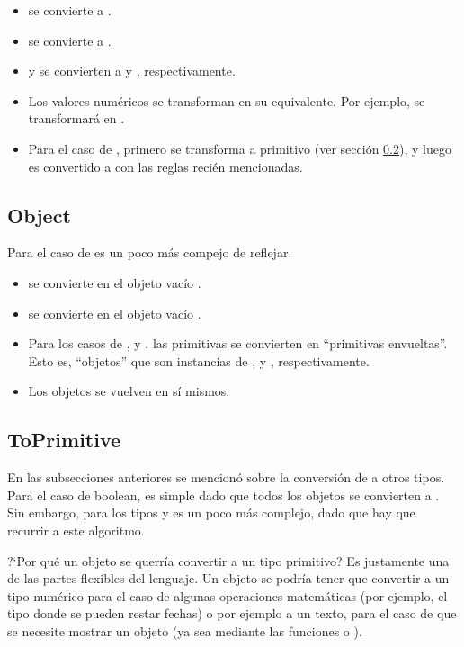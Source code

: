 \begin{itemize}
\item {} se convierte a .
\item {} se convierte a .
\item {} y  se convierten a  y , respectivamente.
\item Los valores numéricos se transforman en su  equivalente. Por ejemplo,  se transformará en .
\item Para el caso de , primero se transforma a primitivo (ver sección \ref{subsec:toprimitive}), y luego es convertido a  con las reglas recién mencionadas.
\end{itemize}

\subsection{Object}

Para el caso de  es un poco más compejo de reflejar.

\begin{itemize}
\item {} se convierte en el objeto vacío \code{\{\}}.
\item {} se convierte en el objeto vacío \code{\{\}}.
\item Para los casos de ,  y , las primitivas se convierten en "`primitivas envueltas"'. Esto es, "`objetos"' que son instancias de ,  y , respectivamente.
\item Los objetos se vuelven en sí mismos.
\end{itemize}

\subsection{ToPrimitive}
\label{subsec:toprimitive}

En las subsecciones anteriores se mencionó sobre la conversión de  a otros tipos. Para el caso de boolean, es simple dado que todos los objetos se convierten a . Sin embargo, para los tipos  y  es un poco más complejo, dado que hay que recurrir a este algoritmo. 

?`Por qué un objeto se querría convertir a un tipo primitivo? Es justamente una de las partes flexibles del lenguaje. Un objeto se podría tener que convertir a un tipo numérico para el caso de algunas operaciones matemáticas (por ejemplo, el tipo  donde se pueden restar fechas) o por ejemplo a un texto, para el caso de que se necesite mostrar un objeto (ya sea mediante las funciones  o ).

